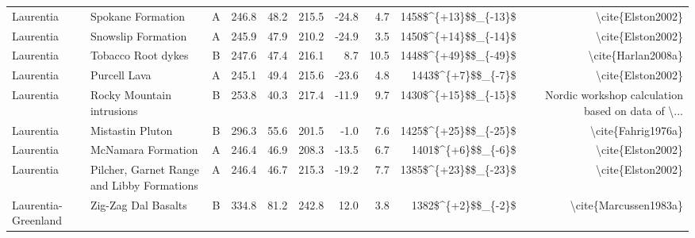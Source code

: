 \begin{longtable}{p{1 in}p{1 in}rrrrrrrr}
                     Laurentia &                                Spokane Formation &      A &     246.8 &      48.2 & 215.5 & -24.8 &       4.7 &   1458\$\textasciicircum \{+13\}\$\$\_\{-13\}\$ &                                  \textbackslash cite\{Elston2002\} \\
                     Laurentia &                               Snowslip Formation &      A &     245.9 &      47.9 & 210.2 & -24.9 &       3.5 &   1450\$\textasciicircum \{+14\}\$\$\_\{-14\}\$ &                                  \textbackslash cite\{Elston2002\} \\
                     Laurentia &                               Tobacco Root dykes &      B &     247.6 &      47.4 & 216.1 &   8.7 &      10.5 &   1448\$\textasciicircum \{+49\}\$\$\_\{-49\}\$ &                                 \textbackslash cite\{Harlan2008a\} \\
                     Laurentia &                                     Purcell Lava &      A &     245.1 &      49.4 & 215.6 & -23.6 &       4.8 &     1443\$\textasciicircum \{+7\}\$\$\_\{-7\}\$ &                                  \textbackslash cite\{Elston2002\} \\
                     Laurentia &                        Rocky Mountain intrusions &      B &     253.8 &      40.3 & 217.4 & -11.9 &       9.7 &   1430\$\textasciicircum \{+15\}\$\$\_\{-15\}\$ &  Nordic workshop calculation based on data of \textbackslash ... \\
                     Laurentia &                                 Mistastin Pluton &      B &     296.3 &      55.6 & 201.5 &  -1.0 &       7.6 &   1425\$\textasciicircum \{+25\}\$\$\_\{-25\}\$ &                                 \textbackslash cite\{Fahrig1976a\} \\
                     Laurentia &                               McNamara Formation &      A &     246.4 &      46.9 & 208.3 & -13.5 &       6.7 &     1401\$\textasciicircum \{+6\}\$\$\_\{-6\}\$ &                                  \textbackslash cite\{Elston2002\} \\
                     Laurentia &       Pilcher, Garnet Range and Libby Formations &      A &     246.4 &      46.7 & 215.3 & -19.2 &       7.7 &   1385\$\textasciicircum \{+23\}\$\$\_\{-23\}\$ &                                  \textbackslash cite\{Elston2002\} \\
           Laurentia-Greenland &                              Zig-Zag Dal Basalts &      B &     334.8 &      81.2 & 242.8 &  12.0 &       3.8 &     1382\$\textasciicircum \{+2\}\$\$\_\{-2\}\$ &                              \textbackslash cite\{Marcussen1983a\} \\

\end{longtable}
